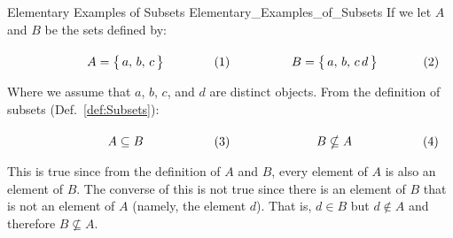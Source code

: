         \begin{fexample}{Elementary Examples of Subsets}
                        {Elementary_Examples_of_Subsets}
            If we let $A$ and $B$ be the sets defined by:
            \par\hfill\par
            \begin{subequations}
                \begin{minipage}[b]{0.49\textwidth}
                    \begin{equation}
                        A=\big\{\,a,\,b,\,c\,\big\}
                    \end{equation}
                \end{minipage}
                \hfill
                \begin{minipage}[b]{0.49\textwidth}
                    \begin{equation}
                        B=\big\{\,a,\,b,\,c\,d\,\big\}
                    \end{equation}
                \end{minipage}
            \end{subequations}
            \par\vspace{2.5ex}
            Where we assume that $a$, $b$, $c$, and $d$ are distinct objects.
            From the definition of subsets (Def.~\ref{def:Subsets}):
            \par\hfill\par
            \begin{subequations}
                \begin{minipage}[b]{0.49\textwidth}
                    \begin{equation}
                        A\subseteq{B}
                    \end{equation}
                \end{minipage}
                \hfill
                \begin{minipage}[b]{0.49\textwidth}
                    \begin{equation}
                        B\nsubseteq{A}
                    \end{equation}
                \end{minipage}
            \end{subequations}
            \par\vspace{2.5ex}
            This is true since from the definition of $A$ and $B$, every element
            of $A$ is also an element of $B$. The converse of this is not true
            since there is an element of $B$ that is not an element of $A$
            (namely, the element $d$). That is, $d\in{B}$ but $d\notin{A}$ and
            therefore $B\nsubseteq{A}$.
        \end{fexample}
